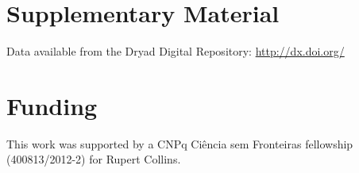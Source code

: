 \documentclass[12pt]{article}
\begin{document}
\section*{Supplementary Material}

Data available from the Dryad Digital Repository: \url{http://dx.doi.org/}


\section*{Funding}

This work was supported by a CNPq Ci\^encia sem Fronteiras fellowship (400813/2012-2) for Rupert Collins.



\end{document}
